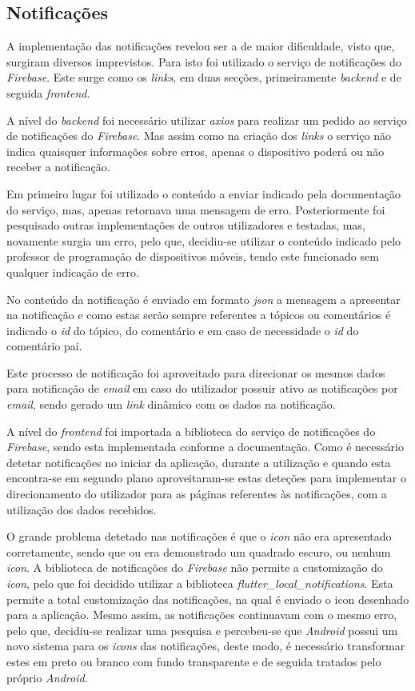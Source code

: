 \subsection{Notificações}

A implementação das notificações revelou ser a de maior dificuldade, visto que, surgiram diversos imprevistos. Para isto foi utilizado o serviço de notificações do \textit{Firebase}. Este surge como os \textit{links}, em duas secções, primeiramente \textit{backend} e de seguida \textit{frontend}.

A nível do \textit{backend} foi necessário utilizar \textit{axios} para realizar um pedido ao serviço de notificações do \textit{Firebase}. Mas assim como na criação dos \textit{links} o serviço não indica quaisquer informações sobre erros, apenas o dispositivo poderá ou não receber a notificação. 

Em primeiro lugar foi utilizado o conteúdo a enviar indicado pela documentação do serviço, mas, apenas retornava uma mensagem de erro. Posteriormente foi pesquisado outras implementações de outros utilizadores e testadas, mas, novamente surgia um erro, pelo que, decidiu-se utilizar o conteúdo indicado pelo professor de programação de dispositivos móveis, tendo este funcionado sem qualquer indicação de erro. 

No conteúdo da notificação é enviado em formato \textit{\acrshort{json}} a mensagem a apresentar na notificação e como estas serão sempre referentes a tópicos ou comentários é indicado o \textit{id} do tópico, do comentário e em caso de necessidade o \textit{id} do comentário pai.

Este processo de notificação foi aproveitado para direcionar os mesmos dados para notificação de \textit{email} em caso do utilizador possuir ativo as notificações por \textit{email}, sendo gerado um \textit{link} dinâmico com os dados na notificação.

A nível do \textit{frontend} foi importada a biblioteca do serviço de notificações do \textit{Firebase}, sendo esta implementada conforme a documentação. Como é necessário detetar notificações no iniciar da aplicação, durante a utilização e quando esta encontra-se em segundo plano aproveitaram-se estas deteções para implementar o direcionamento do utilizador para as páginas referentes às notificações, com a utilização dos dados recebidos.

O grande problema detetado nas notificações é que o \textit{icon} não era apresentado corretamente, sendo que ou era demonstrado um quadrado escuro, ou nenhum \textit{icon}. A biblioteca de notificações do \textit{Firebase} não permite a customização do \textit{icon}, pelo que foi decidido utilizar a biblioteca \textit{flutter\_local\_notifications}. Esta permite a total customização das notificações, na qual é enviado o icon desenhado para a aplicação. Mesmo assim, as notificações continuavam com o mesmo erro, pelo que, decidiu-se realizar uma pesquisa e percebeu-se que \textit{Android} possui um novo sistema para os \textit{icons} das notificações, deste modo, é necessário transformar estes em preto ou branco com fundo transparente e de seguida tratados pelo próprio \textit{Android}.

